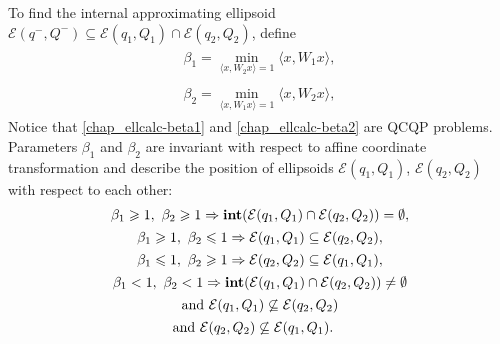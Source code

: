 \documentclass[letterpaper,10pt,english]{sphinxmanual}
\begin{document}
To find the internal approximating ellipsoid
\({\mathcal E}(q^-,Q^-)\subseteq{\mathcal E}(q_1,Q_1)\cap{\mathcal E}(q_2,Q_2)\),
define
\label{chap_ellcalc:equation-beta1}\begin{gather}
\begin{split}\beta_1 = \min_{\langle x,W_2x\rangle=1}\langle x,W_1x\rangle,\end{split}\label{chap_ellcalc-beta1}
\end{gather}\label{chap_ellcalc:equation-beta2}\begin{gather}
\begin{split}\beta_2 = \min_{\langle x,W_1x\rangle=1}\langle x,W_2x\rangle,\end{split}\label{chap_ellcalc-beta2}
\end{gather}
Notice that \eqref{chap_ellcalc-beta1} and \eqref{chap_ellcalc-beta2} are QCQP problems. Parameters
\(\beta_1\) and \(\beta_2\) are invariant with respect to affine
coordinate transformation and describe the position of ellipsoids
\({\mathcal E}(q_1,Q_1)\), \({\mathcal E}(q_2,Q_2)\) with
respect to each other:
\begin{gather}
\begin{split}\beta_1\geqslant1,~\beta_2\geqslant1 & \Rightarrow
{\bf int}({\mathcal E}(q_1,Q_1)\cap{\mathcal E}(q_2,Q_2))=\emptyset, \\\end{split}\notag\\\begin{split}\beta_1\geqslant1,~\beta_2\leqslant1 & \Rightarrow {\mathcal E}(q_1,Q_1)\subseteq{\mathcal E}(q_2,Q_2), \\\end{split}\notag\\\begin{split}\beta_1\leqslant1,~\beta_2\geqslant1 & \Rightarrow {\mathcal E}(q_2,Q_2)\subseteq{\mathcal E}(q_1,Q_1), \\\end{split}\notag\\\begin{split}\beta_1<1,~\beta_2<1 & \Rightarrow
{\bf int}({\mathcal E}(q_1,Q_1)\cap{\mathcal E}(q_2,Q_2))\neq\emptyset \\\end{split}\notag\\\begin{split}&\mbox{and} ~ {\mathcal E}(q_1,Q_1)\not\subseteq{\mathcal E}(q_2,Q_2) \\\end{split}\notag\\\begin{split}&\mbox{and} ~ {\mathcal E}(q_2,Q_2)\not\subseteq{\mathcal E}(q_1,Q_1).\end{split}\notag
\end{gather}
\end{document}
